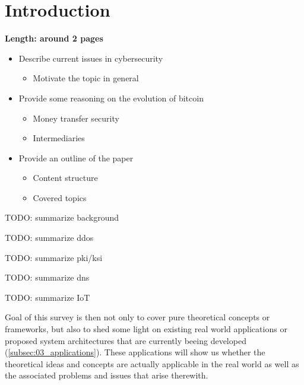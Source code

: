 \section{Introduction}

\textbf{Length: around 2 pages}

\begin{itemize}
  \item Describe current issues in cybersecurity
  \begin{itemize}
    \item Motivate the topic in general
  \end{itemize}
  \item Provide some reasoning on the evolution of bitcoin
  \begin{itemize}
    \item Money transfer security
    \item Intermediaries
  \end{itemize}
  \item Provide an outline of the paper
  \begin{itemize}
    \item Content structure
    \item Covered topics
  \end{itemize}
\end{itemize}

TODO: summarize background

TODO: summarize ddos

TODO: summarize pki/ksi

TODO: summarize dns

TODO: summarize IoT

Goal of this survey is then not only to cover pure theoretical concepts or frameworks, but also to shed some light on existing real world applications or proposed system architectures that are currently beeing developed (\ref{subsec:03_applications}). These applications will show us whether the theoretical ideas and concepts are actually applicable in the real world as well as the associated problems and issues that arise therewith.
